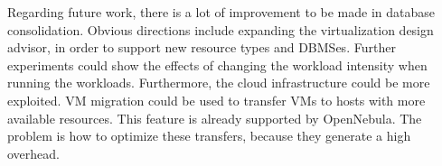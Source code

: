 Regarding future work, there is a lot of improvement to be made in database consolidation. Obvious directions include expanding the virtualization design advisor, in order to support new resource types and DBMSes. Further experiments could show the effects of changing the workload intensity when running the workloads. Furthermore, the cloud infrastructure could be more exploited. VM migration could be used to transfer VMs to hosts with more available resources.  This feature is already supported by OpenNebula. The problem is how to optimize these transfers, because they generate a high overhead. 

